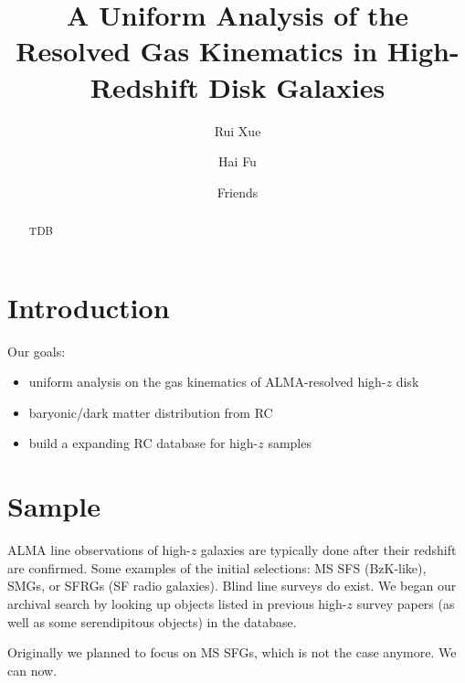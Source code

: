 \documentclass[twocolumn,tighten]{aastex62}
\begin{document}
\title{A Uniform Analysis of the Resolved Gas Kinematics in High-Redshift Disk Galaxies}

\author[0000-0001-7689-9305]{Rui Xue}

\author[0000-0001-9608-6395]{Hai Fu}

\author[0000-0001-9608-6395]{Friends}

\begin{abstract}
TDB
\end{abstract}



\section{Introduction}

Our goals:

\begin{itemize}

\item uniform analysis on the gas kinematics of ALMA-resolved high-$z$ disk

\item baryonic/dark matter distribution from RC

\item build a expanding RC database for high-$z$ samples

\end{itemize}

\section{Sample}

ALMA line observations of high-$z$ galaxies are typically done after their redshift are confirmed. 
Some examples of the initial selections: MS SFS (BzK-like), SMGs, or SFRGs (SF radio galaxies).
Blind line surveys do exist.
We began our archival search by looking up objects listed in previous high-$z$ survey papers (as well as some serendipitous objects) in the database.

Originally we planned to focus on MS SFGs, which is not the case anymore.
We can now.
\end{document}
